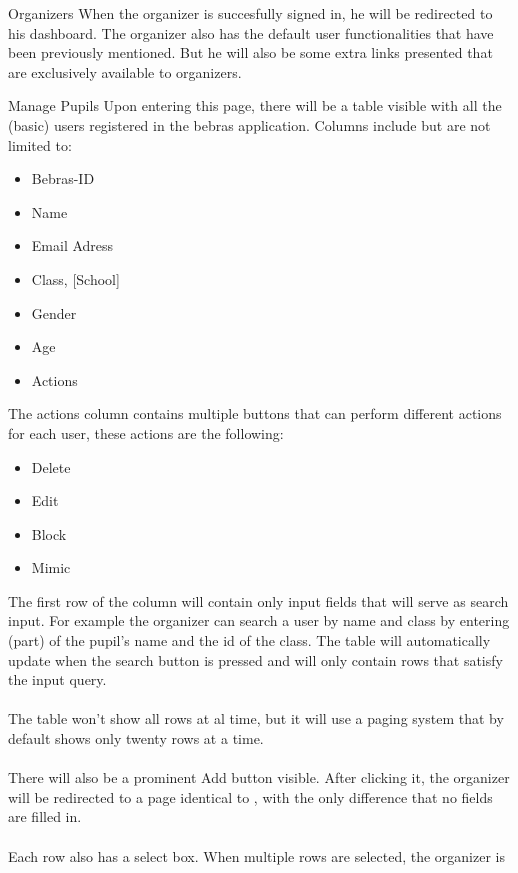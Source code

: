 \documentclass[]{article}
\begin{document}
\begin{section}{Organizers}
	When the organizer is succesfully signed in, he will be redirected to his dashboard.
	The organizer also has the default user functionalities that have been previously
	mentioned. But he will also be some extra links presented that are exclusively
	available to organizers.
	\begin{subsection}{Manage Pupils}
		\label{sec:organizer_manage_pupils}
		Upon entering this page, there will be a table visible with all the (basic) users
		registered in the bebras application. Columns include but are not limited to:
		\begin{itemize}
			\item Bebras-ID
			\item Name
			\item Email Adress
			\item Class, [School]
			\item Gender
			\item Age
			\item Actions
		\end{itemize}
		The actions column contains multiple buttons that can perform different actions
		for each user, these actions are the following:
		\begin{itemize}
			\item Delete
			\item Edit
			\item Block
			\item Mimic
		\end{itemize}
		The first row of the column will contain only input fields that will serve as
		search input. For example the organizer can search a user by name and class by
		entering (part) of the pupil's name and the id of the class. The table will
		automatically update when the search button is pressed and will only contain
		rows that satisfy the input query.\\
		\\
		The table won't show all rows at al time, but it will use a paging system that
		by default shows only twenty rows at a time.\\
		\\
		There will also be a prominent Add button visible. After clicking it, the
		organizer will be redirected to a page identical to
		, with the only difference that no fields
		are filled in. \\
		\\
		Each row also has a select box. When multiple rows are selected, the organizer is

\end{subsection}
\end{section}
\end{document}
